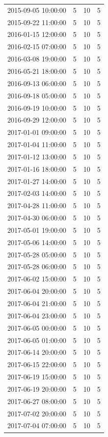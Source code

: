 \begin{tabular}{lrrr}
2015-09-05 10:00:00 & 5 & 10 & 5 \\
2015-09-22 11:00:00 & 5 & 10 & 5 \\
2016-01-15 12:00:00 & 5 & 10 & 5 \\
2016-02-15 07:00:00 & 5 & 10 & 5 \\
2016-03-08 19:00:00 & 5 & 10 & 5 \\
2016-05-21 18:00:00 & 5 & 10 & 5 \\
2016-09-13 06:00:00 & 5 & 10 & 5 \\
2016-09-18 05:00:00 & 5 & 10 & 5 \\
2016-09-19 10:00:00 & 5 & 10 & 5 \\
2016-09-29 12:00:00 & 5 & 10 & 5 \\
2017-01-01 09:00:00 & 5 & 10 & 5 \\
2017-01-04 11:00:00 & 5 & 10 & 5 \\
2017-01-12 13:00:00 & 5 & 10 & 5 \\
2017-01-16 18:00:00 & 5 & 10 & 5 \\
2017-01-27 14:00:00 & 5 & 10 & 5 \\
2017-02-03 14:00:00 & 5 & 10 & 5 \\
2017-04-28 11:00:00 & 5 & 10 & 5 \\
2017-04-30 06:00:00 & 5 & 10 & 5 \\
2017-05-01 19:00:00 & 5 & 10 & 5 \\
2017-05-06 14:00:00 & 5 & 10 & 5 \\
2017-05-28 05:00:00 & 5 & 10 & 5 \\
2017-05-28 06:00:00 & 5 & 10 & 5 \\
2017-06-02 15:00:00 & 5 & 10 & 5 \\
2017-06-04 20:00:00 & 5 & 10 & 5 \\
2017-06-04 21:00:00 & 5 & 10 & 5 \\
2017-06-04 23:00:00 & 5 & 10 & 5 \\
2017-06-05 00:00:00 & 5 & 10 & 5 \\
2017-06-05 01:00:00 & 5 & 10 & 5 \\
2017-06-14 20:00:00 & 5 & 10 & 5 \\
2017-06-15 22:00:00 & 5 & 10 & 5 \\
2017-06-19 15:00:00 & 5 & 10 & 5 \\
2017-06-19 20:00:00 & 5 & 10 & 5 \\
2017-06-27 08:00:00 & 5 & 10 & 5 \\
2017-07-02 20:00:00 & 5 & 10 & 5 \\
2017-07-04 07:00:00 & 5 & 10 & 5 \\

\end{tabular}
